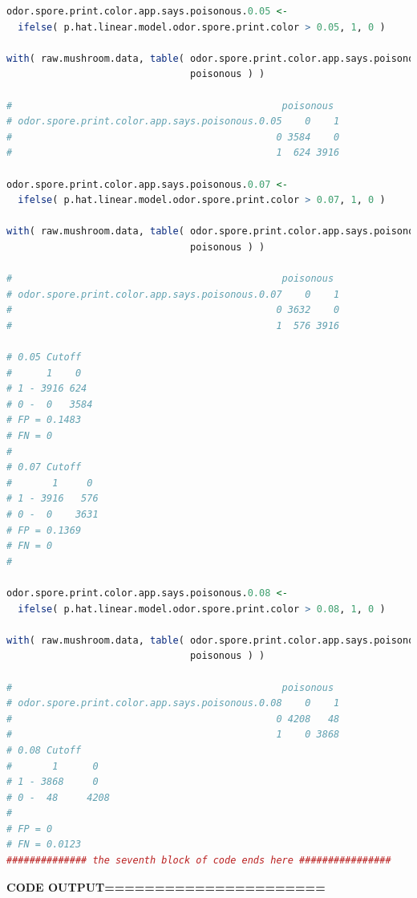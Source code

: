 \documentclass[12pt]{article}
\begin{document}
\begin{lstlisting}[language = R]
odor.spore.print.color.app.says.poisonous.0.05 <- 
  ifelse( p.hat.linear.model.odor.spore.print.color > 0.05, 1, 0 )

with( raw.mushroom.data, table( odor.spore.print.color.app.says.poisonous.0.05, 
                                poisonous ) )

#                                               poisonous
# odor.spore.print.color.app.says.poisonous.0.05    0    1
#                                              0 3584    0
#                                              1  624 3916

odor.spore.print.color.app.says.poisonous.0.07 <- 
  ifelse( p.hat.linear.model.odor.spore.print.color > 0.07, 1, 0 )

with( raw.mushroom.data, table( odor.spore.print.color.app.says.poisonous.0.07, 
                                poisonous ) )

#                                               poisonous
# odor.spore.print.color.app.says.poisonous.0.07    0    1
#                                              0 3632    0
#                                              1  576 3916

# 0.05 Cutoff 
#      1    0 
# 1 - 3916 624 
# 0 -  0   3584
# FP = 0.1483
# FN = 0 
#
# 0.07 Cutoff
#       1     0
# 1 - 3916   576
# 0 -  0    3631
# FP = 0.1369
# FN = 0 
#

odor.spore.print.color.app.says.poisonous.0.08 <- 
  ifelse( p.hat.linear.model.odor.spore.print.color > 0.08, 1, 0 )

with( raw.mushroom.data, table( odor.spore.print.color.app.says.poisonous.0.08, 
                                poisonous ) )

#                                               poisonous
# odor.spore.print.color.app.says.poisonous.0.08    0    1
#                                              0 4208   48
#                                              1    0 3868
# 0.08 Cutoff
#       1      0
# 1 - 3868     0
# 0 -  48     4208
#
# FP = 0
# FN = 0.0123
############## the seventh block of code ends here ################


\end{lstlisting}

\textbf{CODE OUTPUT======================}
\end{document}

